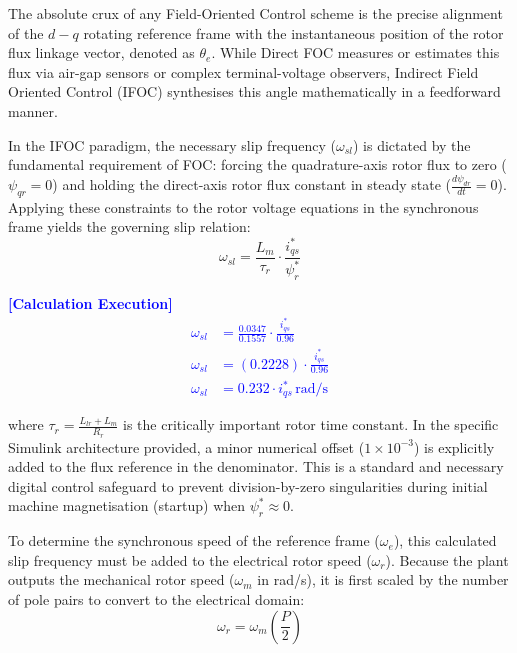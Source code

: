 \documentclass[12pt]{article}
\begin{document}
The absolute crux of any Field-Oriented Control scheme is the precise alignment of the $d-q$ rotating reference frame with the instantaneous position of the rotor flux linkage vector, denoted as $\theta_e$. While Direct FOC measures or estimates this flux via air-gap sensors or complex terminal-voltage observers, Indirect Field Oriented Control (IFOC) synthesises this angle mathematically in a feedforward manner. 

In the IFOC paradigm, the necessary slip frequency ($\omega_{sl}$) is dictated by the fundamental requirement of FOC: forcing the quadrature-axis rotor flux to zero ($\psi_{qr} = 0$) and holding the direct-axis rotor flux constant in steady state ($\frac{d\psi_{dr}}{dt} = 0$). Applying these constraints to the rotor voltage equations in the synchronous frame yields the governing slip relation:
\begin{equation}
    \omega_{sl} = \frac{L_m}{\tau_r} \cdot \frac{i_{qs}^*}{\psi_r^*}
\end{equation}

    \textcolor{blue}{\textbf{[Calculation Execution]} 
    \begin{align*}
        \omega_{sl} &= \frac{0.0347}{0.1557} \cdot \frac{i_{qs}^*}{0.96} \\
        \omega_{sl} &= (0.2228) \cdot \frac{i_{qs}^*}{0.96} \\
        \omega_{sl} &= 0.232 \cdot i_{qs}^* \, \text{rad/s}
    \end{align*}}

where $\tau_r = \frac{L_{lr} + L_m}{R_r}$ is the critically important rotor time constant. In the specific Simulink architecture provided, a minor numerical offset ($1 \times 10^{-3}$) is explicitly added to the flux reference in the denominator. This is a standard and necessary digital control safeguard to prevent division-by-zero singularities during initial machine magnetisation (startup) when $\psi_r^* \approx 0$.

To determine the synchronous speed of the reference frame ($\omega_e$), this calculated slip frequency must be added to the electrical rotor speed ($\omega_r$). Because the plant outputs the mechanical rotor speed ($\omega_m$ in rad/s), it is first scaled by the number of pole pairs to convert to the electrical domain:
\begin{equation}
    \omega_r = \omega_m \left(\frac{P}{2}\right)
\end{equation}
\end{document}
